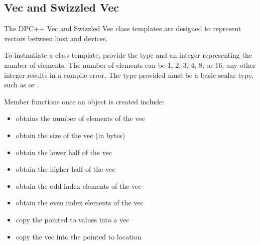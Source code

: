 \documentclass[letterpaper,10pt,english]{sphinxmanual}
\begin{document}
\begin{fulllineitems}
\begin{fulllineitems}
\end{fulllineitems}


\end{fulllineitems}



\subsection{Vec and Swizzled Vec}
\label{\detokenize{programming-interface/vec-and-swizzled-vec:vec-and-swizzled-vec}}\label{\detokenize{programming-interface/vec-and-swizzled-vec:id1}}\label{\detokenize{programming-interface/vec-and-swizzled-vec::doc}}
The DPC++ Vec and Swizzled Vec class templates are designed to represent
vectors between host and devices.

To instantiate a  class template, provide the type and an integer
representing the number of elements. The number of elements can be 1, 2,
3, 4, 8, or 16; any other integer results in a compile error. The type
provided must be a basic scalar type, such as  or .

Member functions once an object is created include:
\begin{itemize}
\item {} 
 \textendash{} obtains the number of elements of the vec

\item {} 
 \textendash{} obtain the size of the vec (in bytes)

\item {} 
 \textendash{} obtain the lower half of the vec

\item {} 
 \textendash{} obtain the higher half of the vec

\item {} 
 \textendash{} obtain the odd index elements of the vec

\item {} 
 \textendash{} obtain the even index elements of the vec

\item {} 
 \textendash{} copy the pointed to values into a vec

\item {} 
 \textendash{} copy the vec into the pointed to location

\end{itemize}
\end{document}
